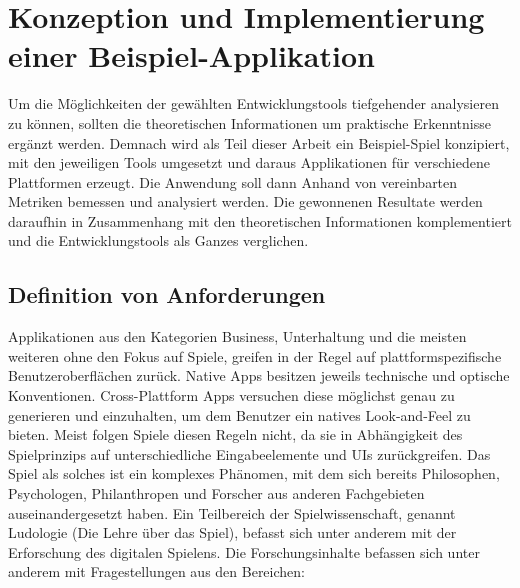 

\chapter{Konzeption und Implementierung einer Beispiel-Applikation}
Um die Möglichkeiten der gewählten Entwicklungstools tiefgehender analysieren zu können, sollten die theoretischen Informationen um praktische Erkenntnisse ergänzt werden. Demnach wird als Teil dieser Arbeit ein Beispiel-Spiel konzipiert, mit den jeweiligen Tools umgesetzt und daraus Applikationen für verschiedene Plattformen erzeugt. Die Anwendung soll dann Anhand von vereinbarten Metriken bemessen und analysiert werden. Die gewonnenen Resultate werden daraufhin in Zusammenhang mit den theoretischen Informationen komplementiert und die Entwicklungstools als Ganzes verglichen. 

\section{Definition von Anforderungen}
\label{sec:definition_anforderungen}
Applikationen aus den Kategorien Business, Unterhaltung und die meisten weiteren ohne den Fokus auf Spiele, greifen in der Regel auf plattformspezifische Benutzeroberflächen zurück. Native Apps besitzen jeweils technische und optische Konventionen. Cross-Plattform Apps versuchen diese möglichst genau zu generieren und einzuhalten, um dem Benutzer ein natives Look-and-Feel zu bieten. 
Meist folgen Spiele diesen Regeln nicht, da sie in Abhängigkeit des Spielprinzips auf unterschiedliche Eingabeelemente und UIs zurückgreifen. 
Das Spiel als solches ist ein komplexes Phänomen, mit dem sich bereits Philosophen, Psychologen, Philanthropen und Forscher aus anderen Fachgebieten auseinandergesetzt haben. Ein Teilbereich der Spielwissenschaft, genannt Ludologie (Die Lehre über das Spiel), befasst sich unter anderem mit der Erforschung des digitalen Spielens. \citep{ludologie} Die Forschungsinhalte befassen sich unter anderem mit Fragestellungen aus den Bereichen:

